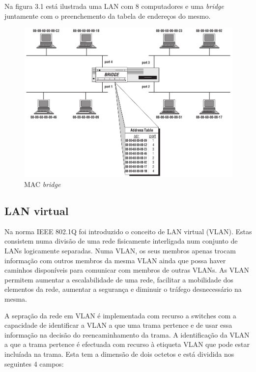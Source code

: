 \par Na figura 3.1 está ilustrada uma LAN com 8 computadores e uma \textit{bridge} juntamente com o preenchemento da tabela de endereços do mesmo.



\begin{figure}[H]
  \centering
  \includegraphics[width=1\textwidth]{Bridge.png}
  \caption[MAC bridge]{MAC \textit{bridge} \cite{make}}
  \label{fig:airbus1}
\end{figure}

\subsection{LAN virtual}

Na norma IEEE 802.1Q foi introduzido o conceito de LAN virtual (VLAN). Estas consistem numa divisão de uma rede fisicamente interligada num conjunto de LANs logicamente separadas. Numa VLAN, os seus membros apenas trocam informação com outros membros da mesma VLAN ainda que possa haver caminhos disponíveis para comunicar com membros de outras VLANs. As VLAN permitem aumentar a escalabilidade de uma rede, facilitar a mobilidade dos elementos da rede, aumentar a segurança e diminuir o tráfego desnecessário na mesma. \par

A sepração da rede em VLAN é implementada com recurso a switches com a capacidade de identificar a VLAN a que uma trama pertence e de usar essa informação na decisão do reencaminhamento da trama. A identificação da VLAN a que a trama pertence é efectuada com recurso à etiqueta VLAN que pode estar incluíada na trama. Esta tem a dimensão de dois octetos e está dividida nos seguintes 4 campos:

